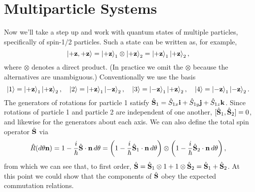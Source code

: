 \documentclass[../p116main.tex]{subfiles}
\begin{document}
\section{Multiparticle Systems}
Now we'll take a step up and work with quantum states of multiple particles, specifically of spin-1/2 particles.
Such a state can be written as, for example,
\[ \left| +\mathbf{z}, +\mathbf{z} \right> = \left| +\mathbf{z} \right>_1 \otimes \left| +\mathbf{z} \right>_2 = \left| +\mathbf{z} \right>_1 \left| +\mathbf{z} \right>_2, \]
where $\otimes$ denotes a direct product.
(In practice we omit the $\otimes$ because the alternatives are unambiguous.)
Conventionally we use the basis
\[ \left| 1 \right> = \left| +\mathbf{z} \right>_1 \left| +\mathbf{z} \right>_2, \quad \left| 2 \right> = \left| +\mathbf{z} \right>_1 \left| -\mathbf{z} \right>_2, \quad \left| 3 \right> = \left| -\mathbf{z} \right>_1 \left| +\mathbf{z} \right>_2, \quad \left| 4 \right> = \left| -\mathbf{z} \right>_1 \left| -\mathbf{z} \right>_2. \]
The generators of rotations for particle 1 satisfy $\hat{\mathbf{S}}_1 = \hat S_{1x} \mathbf{i} + \hat S_{1y} \mathbf{j} + \hat S_{1z} \mathbf{k}$.
Since rotations of particle 1 and particle 2 are independent of one another, $[\hat{\mathbf{S}}_1, \hat{\mathbf{S}}_2] = 0$, and likewise for the generators about each axis.
We can also define the total spin operator $\hat{\mathbf{S}}$ via
\[ \hat R (d\theta \mathbf{n}) = 1 - \frac{i}{\hbar} \hat{\mathbf{S}} \cdot \mathbf{n} \,d\theta = \left( 1 - \frac{i}{\hbar} \hat{\mathbf{S}}_1 \cdot \mathbf{n} \,d\theta \right) \otimes \left( 1 - \frac{i}{\hbar} \hat{\mathbf{S}}_2 \cdot \mathbf{n} \,d\theta \right), \]
from which we can see that, to first order, $\hat{\mathbf{S}} = \hat{\mathbf{S}}_1 \otimes 1 + 1 \otimes \hat{\mathbf{S}}_2 = \hat{\mathbf{S}}_1 + \hat{\mathbf{S}}_2$.
At this point we could show that the components of $\hat{\mathbf{S}}$ obey the expected commutation relations.
\end{document}
